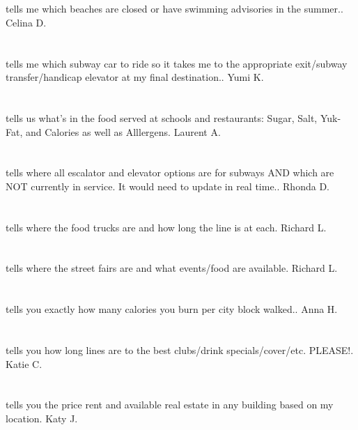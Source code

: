 \section{}tells me which beaches are closed or have swimming advisories in the summer.. Celina D.
\section{}tells me which subway car to ride so it takes me to the appropriate exit/subway transfer/handicap elevator at my final destination.. Yumi K.
\section{}tells us what's in the food served at schools and restaurants: Sugar,  Salt,  Yuk-Fat,  and Calories as well as Alllergens. Laurent A.
\section{}tells where all escalator and elevator options are for subways AND which are NOT currently in service. It would need to update in real time.. Rhonda D.
\section{}tells where the food trucks are and how long the line is at each. Richard L.
\section{}tells where the street fairs are and what events/food are available. Richard L.
\section{}tells you exactly how many calories you burn per city block walked.. Anna H.
\section{} tells you how long lines are to the best clubs/drink specials/cover/etc. PLEASE!. Katie C.
\section{}tells you the price rent and available real estate in any building based on my location. Katy J.
